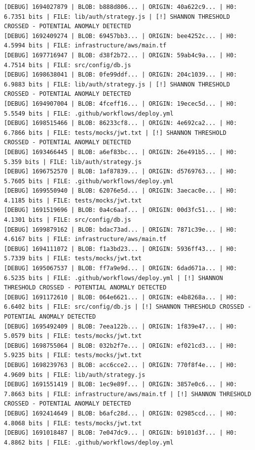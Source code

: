 \documentclass[12pt, a4paper, oneside]{report}
\begin{document}
\begin{lstlisting}[basicstyle=\tiny\ttfamily]
[DEBUG] 1694027879 | BLOB: b888d806... | ORIGIN: 40a622c9... | H0: 6.7351 bits | FILE: lib/auth/strategy.js | [!] SHANNON THRESHOLD CROSSED - POTENTIAL ANOMALY DETECTED
[DEBUG] 1692409274 | BLOB: 69457bb3... | ORIGIN: bee4252c... | H0: 4.5994 bits | FILE: infrastructure/aws/main.tf
[DEBUG] 1697716947 | BLOB: d38f2b72... | ORIGIN: 59ab4c9a... | H0: 4.7514 bits | FILE: src/config/db.js
[DEBUG] 1698638041 | BLOB: 0fe99ddf... | ORIGIN: 204c1039... | H0: 6.9883 bits | FILE: lib/auth/strategy.js | [!] SHANNON THRESHOLD CROSSED - POTENTIAL ANOMALY DETECTED
[DEBUG] 1694907004 | BLOB: 4fceff16... | ORIGIN: 19ecec5d... | H0: 5.5549 bits | FILE: .github/workflows/deploy.yml
[DEBUG] 1698515466 | BLOB: 86233cf8... | ORIGIN: 4e692ca2... | H0: 6.7866 bits | FILE: tests/mocks/jwt.txt | [!] SHANNON THRESHOLD CROSSED - POTENTIAL ANOMALY DETECTED
[DEBUG] 1693466445 | BLOB: a6ef83bc... | ORIGIN: 26e491b5... | H0: 5.359 bits | FILE: lib/auth/strategy.js
[DEBUG] 1696752570 | BLOB: 1af87839... | ORIGIN: d5769763... | H0: 5.7605 bits | FILE: .github/workflows/deploy.yml
[DEBUG] 1699550940 | BLOB: 62076e5d... | ORIGIN: 3aecac0e... | H0: 4.1185 bits | FILE: tests/mocks/jwt.txt
[DEBUG] 1691519696 | BLOB: 0a4c6aaf... | ORIGIN: 00d3fc51... | H0: 4.1301 bits | FILE: src/config/db.js
[DEBUG] 1699879162 | BLOB: bdac73ad... | ORIGIN: 7871c39e... | H0: 4.6167 bits | FILE: infrastructure/aws/main.tf
[DEBUG] 1694111072 | BLOB: f1a3bd23... | ORIGIN: 5936ff43... | H0: 5.7339 bits | FILE: tests/mocks/jwt.txt
[DEBUG] 1695067537 | BLOB: ff7a9e9d... | ORIGIN: 6dad671a... | H0: 6.5235 bits | FILE: .github/workflows/deploy.yml | [!] SHANNON THRESHOLD CROSSED - POTENTIAL ANOMALY DETECTED
[DEBUG] 1691172610 | BLOB: 064e6621... | ORIGIN: e4b8268a... | H0: 6.6402 bits | FILE: src/config/db.js | [!] SHANNON THRESHOLD CROSSED - POTENTIAL ANOMALY DETECTED
[DEBUG] 1695492409 | BLOB: 7eea122b... | ORIGIN: 1f839e47... | H0: 5.0579 bits | FILE: tests/mocks/jwt.txt
[DEBUG] 1698755064 | BLOB: 032b2f7e... | ORIGIN: ef021cd3... | H0: 5.9235 bits | FILE: tests/mocks/jwt.txt
[DEBUG] 1698239763 | BLOB: acc6cce2... | ORIGIN: 770f8f4e... | H0: 4.9609 bits | FILE: lib/auth/strategy.js
[DEBUG] 1691551419 | BLOB: 1ec9e89f... | ORIGIN: 3857e0c6... | H0: 7.8663 bits | FILE: infrastructure/aws/main.tf | [!] SHANNON THRESHOLD CROSSED - POTENTIAL ANOMALY DETECTED
[DEBUG] 1692414649 | BLOB: b6afc28d... | ORIGIN: 02985ccd... | H0: 4.8068 bits | FILE: tests/mocks/jwt.txt
[DEBUG] 1691018487 | BLOB: 7e047dc9... | ORIGIN: b9101d3f... | H0: 4.8862 bits | FILE: .github/workflows/deploy.yml

\end{lstlisting}
\end{document}
